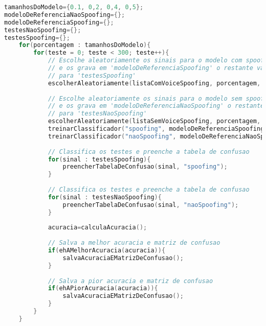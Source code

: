 \begin{lstlisting}[language=C++, caption={Algoritmo do experimento 3}, label={lst:experiment03Algo}]
tamanhosDoModelo={0.1, 0,2, 0,4, 0,5};
modeloDeReferenciaNaoSpoofing={};
modeloDeReferenciaSpoofing={};
testesNaoSpoofing={};
testesSpoofing={};
	for(porcentagem : tamanhosDoModelo){
		for(teste = 0; teste < 300; teste++){
			// Escolhe aleatoriamente os sinais para o modelo com spoofing 
			// e os grava em 'modeloDeReferenciaSpoofing' o restante vai 
			// para 'testesSpoofing'
			escolherAleatoriamente(listaComVoiceSpoofing, porcentagem, modeloDeReferenciaSpoofing, testesSpoofing);
			
			// Escolhe aleatoriamente os sinais para o modelo sem spoofing
			// e os grava em 'modeloDeReferenciaNaoSpoofing' o restante vai 
			// para 'testesNaoSpoofing'
			escolherAleatoriamente(listaSemVoiceSpoofing, porcentagem, modeloDeReferenciaNaoSpoofing, testesNaoSpoofing);
			treinarClassificador("spoofing", modeloDeReferenciaSpoofing);
			treinarClassificador("naoSpoofing", modeloDeReferenciaNaoSpoofing);
			
			// Classifica os testes e preenche a tabela de confusao
			for(sinal : testesSpoofing){
				preencherTabelaDeConfusao(sinal, "spoofing");
			} 
			
			// Classifica os testes e preenche a tabela de confusao
			for(sinal : testesNaoSpoofing){
				preencherTabelaDeConfusao(sinal, "naoSpoofing");
			}
			
			acuracia=calculaAcuracia();
			
			// Salva a melhor acuracia e matriz de confusao
			if(ehAMelhorAcuracia(acuracia)){
				salvaAcuraciaEMatrizDeConfusao();
			}
			
			// Salva a pior acuracia e matriz de confusao
			if(ehAPiorAcuracia(acuracia)){
				salvaAcuraciaEMatrizDeConfusao();
			}
		}
	}			
\end{lstlisting}